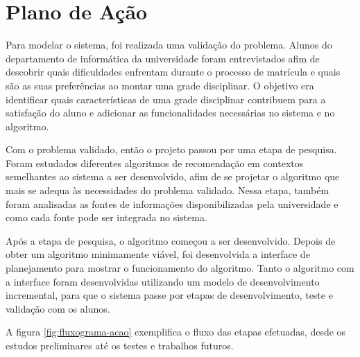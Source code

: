 
\chapter{Plano de Ação}
\label{cha:Plano de Ação}

Para modelar o sistema, foi realizada uma validação do problema. Alunos do departamento de informática da universidade foram entrevistados afim de descobrir quais dificuldades enfrentam durante o processo de matrícula e quais são as suas preferências ao montar uma grade disciplinar. O objetivo era identificar quais características de uma grade disciplinar contribuem para a satisfação do aluno e adicionar as funcionalidades necessárias no sistema e no algoritmo.

Com o problema validado, então o projeto passou por uma etapa de pesquisa. 
Foram estudados diferentes algoritmos de recomendação em contextos semelhantes ao sistema a ser desenvolvido, afim de se projetar o algoritmo que mais se adequa às necessidades do problema validado. 
Nessa etapa, também foram analisadas as fontes de informações disponibilizadas pela universidade e como cada fonte pode ser integrada no sistema. 

Após a etapa de pesquisa, o algoritmo começou a ser desenvolvido. 
Depois de obter um algoritmo minimamente viável, foi desenvolvida a interface de planejamento para mostrar o funcionamento do algoritmo. 
Tanto o algoritmo com a interface foram desenvolvidas utilizando um modelo de desenvolvimento incremental, para que o sistema passe por etapas de desenvolvimento, teste e validação com os alunos. 

A figura \ref{fig:fluxograma-acao} exemplifica o fluxo das etapas efetuadas, desde os estudos preliminares até os testes e trabalhos futuros.

